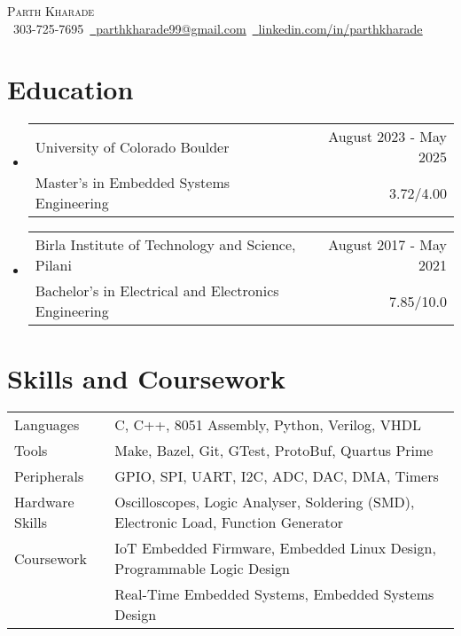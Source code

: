 \documentclass[11pt]{article}
\makeatletter
\newcommand{\resumeSubheadingEdu}[4]{
  \vspace{-2pt}\item
    \begin{tabular*}{1.0\textwidth}[t]{l@{\extracolsep{\fill}}r}
       {\large #1}&{\large #2} \\
       {#3} &{ #4} \\
    \end{tabular*}\vspace{-1pt}
}
\newcommand{\resumeSubHeadingListStart}{\begin{itemize}[leftmargin=0.0in, label={}]}
\newcommand{\resumeSubHeadingListEnd}{\end{itemize}}
\makeatother
\begin{document}
\setlength{\footskip}{4pt}
\begin{center}
  {\huge \scshape Parth Kharade} \\ \vspace{1pt}
  \small \raisebox{-0.1\height}\faPhone\ 303-725-7695{\hspace{0.1cm}}~\href{mailto:parthkharade99@gmail.com}{\raisebox{-0.2\height}\faEnvelope\ \underline{parthkharade99@gmail.com}}~{\hspace{0.1cm}}\href{https://www.linkedin.com/in/parth-k-081287184/}{\raisebox{-0.2\height}\faLinkedin\ \underline{linkedin.com/in/parthkharade}}
  \vspace{-10pt}
\end{center}



\section {Education}
\resumeSubHeadingListStart
\resumeSubheadingEdu
{University of Colorado Boulder}{August 2023 - May 2025}
{Master's in Embedded Systems Engineering}{3.72/4.00}
\vspace{-0.1in}
\resumeSubheadingEdu
{Birla Institute of Technology and Science, Pilani}{August 2017 - May 2021}
{Bachelor's in Electrical and Electronics Engineering}{7.85/10.0}
\resumeSubHeadingListEnd
\vspace{-16pt}
\section{Skills and Coursework}
\vspace{-4mm}
\begin{table}[!htb]
  \begin{tabular} { m{3.1cm} | m{15cm} }
    { Languages }         & {\: C, C++, 8051 Assembly, Python, Verilog, VHDL}               \\
    {Tools}               & {\: Make, Bazel, Git, GTest, ProtoBuf, Quartus Prime}               \\
    {Peripherals}         & {\: GPIO, SPI, UART, I2C, ADC, DAC, DMA, Timers}                                          \\
    {Hardware Skills}          & {\: Oscilloscopes, Logic Analyser, Soldering (SMD), Electronic Load, Function Generator} \\
    {Coursework}          & {\: IoT Embedded Firmware, Embedded Linux Design, Programmable Logic Design}                \\
    {}                    & {\: Real-Time Embedded Systems, Embedded Systems Design}
  \end{tabular}
\end{table}
\vspace{-16pt}
\end{document}
